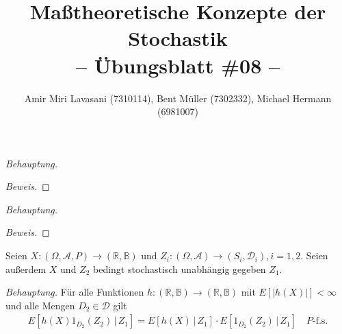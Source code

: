 \documentclass[10pt]{article}
\newcommand{\R}{\mathbb{R}}
\newcommand{\A}{\mathcal{A}}
\newcommand{\D}{\mathcal{D}}
\newcommand{\B}{\mathbb{B}}
\newcommand{\beh}{\textit{Behauptung. }}
\newenvironment{Aufgabe}[2][Aufgabe]{\begin{trivlist}
\item[\hskip \labelsep {\bfseries #1}\hskip \labelsep {\bfseries #2.}]}{\end{trivlist}}
\begin{document}
 
\title{ \textbf{Maßtheoretische Konzepte der Stochastik \\ -- Übungsblatt \#08 --} }

\author{Amir Miri Lavasani (7310114), Bent Müller (7302332),
        Michael Hermann (6981007)}
\maketitle

\begin{Aufgabe}{1} %
\end{Aufgabe}

\beh

\begin{proof}[Beweis]
\end{proof}

\begin{Aufgabe}{2} %
\end{Aufgabe}

\beh 

\begin{proof}[Beweis]
\end{proof}

\begin{Aufgabe}{3} %
	Seien $X : (\Omega, \A, P)\to (\R, \B)$ und $Z_i : (\Omega, \A)\to (S_i, \D_i), i = 1,2$. Seien außerdem $X$ und $Z_2$
	bedingt stochastisch unabhängig gegeben $Z_1$.
\end{Aufgabe}

\beh Für alle Funktionen $h: (\R,\B)\to (\R,\B)$ mit $E[\vert h(X) \vert] < \infty$ und alle Mengen $D_2\in\D$ gilt 
	\begin{align*}
		E[h(X)1_{D_2}(Z_2) \,\vert\, Z_1] = E[h(X) \,\vert\, Z_1] \cdot E[1_{D_2}(Z_2) \,\vert\, Z_1] \quad\text{$P$-f.s.}
	\end{align*}
\end{document}
